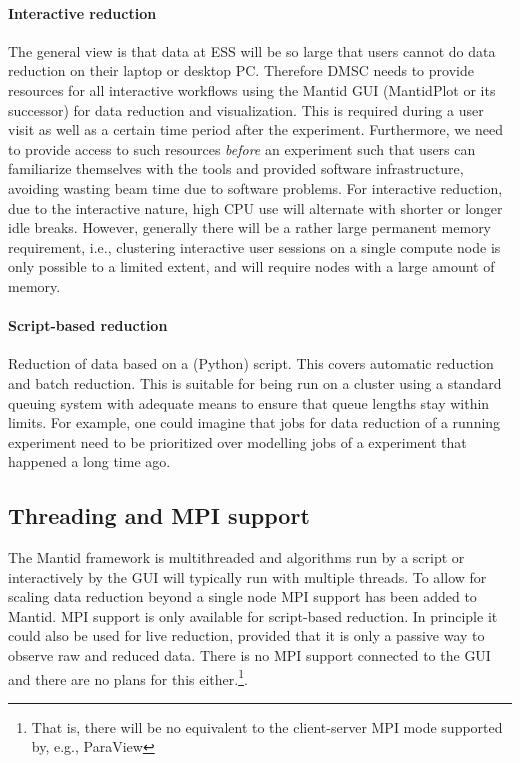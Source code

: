\documentclass[a4paper,english,numbers=noenddot,bibliography=totoc,chapterprefix=on,DIV=12]{scrartcl}
\begin{document}
\paragraph{Interactive reduction} 
The general view is that data at ESS will be so large that users cannot do data reduction on their laptop or desktop PC. Therefore DMSC needs to provide resources for all interactive workflows using the Mantid GUI (MantidPlot or its successor) for data reduction and visualization.
This is required during a user visit as well as a certain time period after the experiment.
Furthermore, we need to provide access to such resources \emph{before} an experiment such that users can familiarize themselves with the tools and provided software infrastructure, avoiding wasting beam time due to software problems.
For interactive reduction, due to the interactive nature, high CPU use will alternate with shorter or longer idle breaks.
However, generally there will be a rather large permanent memory requirement, i.e., clustering interactive user sessions on a single compute node is only possible to a limited extent, and will require nodes with a large amount of memory.

\paragraph{Script-based reduction}
Reduction of data based on a (Python) script.
This covers automatic reduction and batch reduction.
This is suitable for being run on a cluster using a standard queuing system with adequate means to ensure that queue lengths stay within limits.
For example, one could imagine that jobs for data reduction of a running experiment need to be prioritized over modelling jobs of a experiment that happened a long time ago.

\subsection{Threading and MPI support}
\label{sec:threading-and-mpi-support}

The Mantid framework is multithreaded and algorithms run by a script or interactively by the GUI will typically run with multiple threads.
To allow for scaling data reduction beyond a single node MPI support has been added to Mantid.
MPI support is only available for script-based reduction.
In principle it could also be used for live reduction, provided that it is only a passive way to observe raw and reduced data.
There is no MPI support connected to the GUI and there are no plans for this either.\footnote{That is, there will be no equivalent to the client-server MPI mode supported by, e.g., ParaView}.
\end{document}
